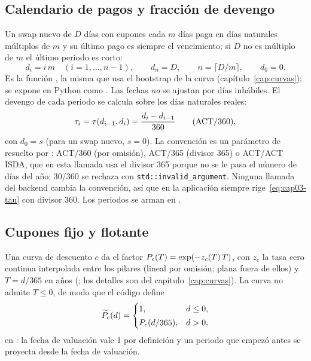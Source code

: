 \subsection{Calendario de pagos y fracción de devengo}\label{sec:cap03-calendario}

Un swap nuevo de $D$ días con cupones cada $m$ días paga en días naturales múltiplos de $m$ y su último pago
es siempre el vencimiento; si $D$ no es múltiplo de $m$ el último periodo es corto:
\begin{equation}\label{eq:cap03-calendario}
  d_i = i\,m\quad(i=1,\dots,n-1),\qquad d_n = D,\qquad n=\lceil D/m\rceil,\qquad d_0=0 .
\end{equation}
Es la función , la misma que usa el bootstrap de
la curva (capítulo~\ref{cap:curvas}); se expone en Python como
. Las fechas \emph{no} se ajustan por días inhábiles.
El devengo de cada periodo se calcula sobre los días naturales reales:
\begin{equation}\label{eq:cap03-tau}
  \tau_i=\tau(d_{i-1},d_i)=\frac{d_i-d_{i-1}}{360}\qquad(\text{ACT/360}),
\end{equation}
con $d_0=s$ (para un swap nuevo, $s=0$). La convención es un parámetro de
 resuelto por
: ACT/360 (por omisión), ACT/365 (divisor 365) o ACT/ACT ISDA, que
en esta llamada usa el divisor 365 porque no se le pasa el número de días del año; 30/360 se rechaza con
\texttt{std::invalid\_argument}. Ninguna llamada del backend cambia la convención, así que en la aplicación
siempre rige~\eqref{eq:cap03-tau} con divisor 360. Los periodos se arman en
.

\subsection{Cupones fijo y flotante}\label{sec:cap03-cupones}

Una curva de descuento $c$ da el factor $P_{c}(T)=\exp(-z_c(T)\,T)$, con $z_c$ la tasa cero continua
interpolada entre los pilares (lineal por omisión; plana fuera de ellos) y $T=d/365$ en años
(; los detalles son del
capítulo~\ref{cap:curvas}). La curva no admite $T\le0$, de modo que el código define
\begin{equation}\label{eq:cap03-df}
  \widetilde P_c(d)=\begin{cases}1, & d\le0,\\[2pt] P_{c}(d/365), & d>0,\end{cases}
\end{equation}
en : la fecha de valuación vale 1 por definición y un
periodo que empezó antes se proyecta desde la fecha de valuación.

